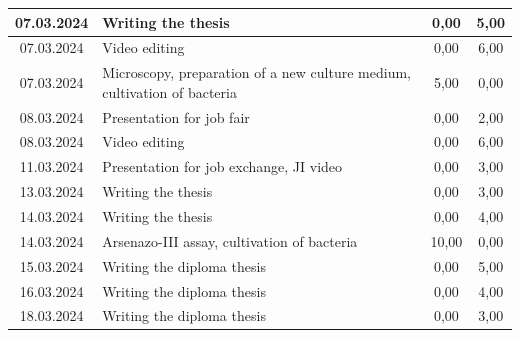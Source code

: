 \begin{longtable}{|c|p{7cm}|c|c|}
    07.03.2024    & Writing the thesis                                                                                              & 0,00                 & 5,00              \\ \hline
    07.03.2024    & Video editing                                                                                                   & 0,00                 & 6,00              \\ \hline
    07.03.2024    & Microscopy, preparation of a new culture medium, cultivation of bacteria & 5,00 & 0,00 \\ \hline
    08.03.2024    & Presentation for job fair                                                                                       & 0,00                 & 2,00              \\ \hline
    08.03.2024    & Video editing                                                                                                   & 0,00                 & 6,00              \\ \hline
    11.03.2024    & Presentation for job exchange, JI video                                                                         & 0,00                 & 3,00              \\ \hline
    13.03.2024    & Writing the thesis                                                                                              & 0,00                 & 3,00              \\ \hline
    14.03.2024    & Writing the thesis                                                                                              & 0,00                 & 4,00              \\ \hline
    14.03.2024    & Arsenazo-III assay, cultivation of bacteria                                                                     & 10,00                & 0,00              \\ \hline
    15.03.2024    & Writing the diploma thesis                                                                                      & 0,00                 & 5,00              \\ \hline
    16.03.2024    & Writing the diploma thesis                                                                                      & 0,00                 & 4,00              \\ \hline
    18.03.2024    & Writing the diploma thesis                                                                                      & 0,00                 & 3,00              \\ \hline

\end{longtable}
